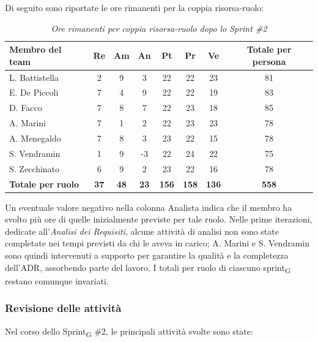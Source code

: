 \documentclass[a4paper, 10pt, colorlinks=true, linkcolor=black, urlcolor=blue, citecolor=blue, hidelinks]{article}
\renewcommand{\arraystretch}{1.2}
\begin{document}
Di seguito sono riportate le ore rimanenti per la coppia risorsa-ruolo:

\begin{table}[H]
    \centering
    \renewcommand{\arraystretch}{1.4}
    \begin{tabular}{|l|c|c|c|c|c|c|c|}
        \hline
        \rowcolor{bluBitless!15}
        \textbf{Membro del team} & \textbf{Re} & \textbf{Am} & \textbf{An} & \textbf{Pt} & \textbf{Pr} & \textbf{Ve} & \textbf{Totale per persona} \\
        \hline
        L. Battistella & 2 & 9 & 3 & 22 & 22 & 23 & 81 \\ \hline
        E. De Piccoli & 7 & 4 & 9 & 22 & 22 & 19 & 83 \\ \hline
        D. Facco & 7 & 8 & 7 & 22 & 23 & 18 & 85 \\ \hline
        A. Marini & 7 & 1 & 2 & 22 & 23 & 23 & 78 \\ \hline
        A. Menegaldo & 7 & 8 & 3 & 23 & 22 & 15 & 78 \\ \hline
        S. Vendramin & 1 & 9 & -3 & 22 & 24 & 22 & 75 \\ \hline
        S. Zecchinato & 6 & 9 & 2 & 23 & 22 & 16 & 78 \\ \hline
        \rowcolor{bluBitless!8}
        \textbf{Totale per ruolo} & \textbf{37} & \textbf{48} & \textbf{23} & \textbf{156} & \textbf{158} & \textbf{136} & \textbf{558} \\
        \hline
    \end{tabular}
    \caption{\textit{Ore rimanenti per coppia risorsa-ruolo dopo lo Sprint \#2}}
\end{table}

Un eventuale valore negativo nella colonna Analista indica che il membro ha svolto più ore di quelle inizialmente previste per tale ruolo. Nelle prime iterazioni, dedicate all'\textit{Analisi dei Requisiti}, alcune attività di analisi non sono state completate nei tempi previsti da chi le aveva in carico; A. Marini e S. Vendramin sono quindi intervenuti a supporto per garantire la qualità e la completezza dell'ADR, assorbendo parte del lavoro. I totali per ruolo di ciascuno sprint\textsubscript{G} restano comunque invariati.

\subsubsection{Revisione delle attività}
Nel corso dello Sprint\textsubscript{G} \#2, le principali attività svolte sono state:
\end{document}
